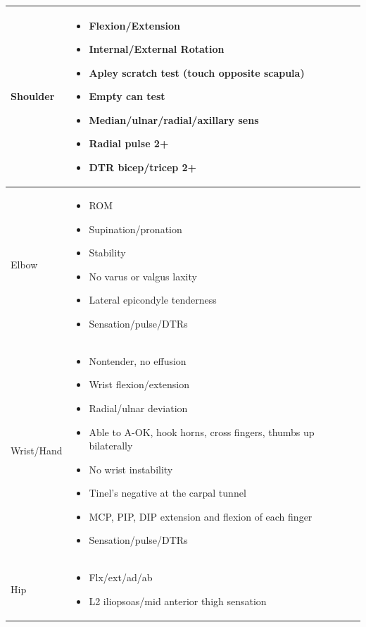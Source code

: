 \documentclass[8pt]{extarticle}
\begin{document}
\begin{tabularx}{\linewidth}{|X|X|}
\hline
Shoulder & 
    \begin{itemize}[leftmargin=*]
        \item[] Flexion/Extension
        \item[] Internal/External Rotation
        \item[] Apley scratch test (touch opposite scapula)
        \item[] Empty can test
        \item[] Median/ulnar/radial/axillary sens
        \item[] Radial pulse 2+
        \item[] DTR bicep/tricep 2+
    \end{itemize}\\
\hline
Elbow & 
    \begin{itemize}[leftmargin=*]
        \item[] ROM
        \item[] Supination/pronation
        \item[] Stability
        \item[] No varus or valgus laxity
        \item[] Lateral epicondyle tenderness
        \item[] Sensation/pulse/DTRs
    \end{itemize}\\
\hline
Wrist/Hand & 
    \begin{itemize}[leftmargin=*]
        \item[] Nontender, no effusion
        \item[] Wrist flexion/extension
        \item[] Radial/ulnar deviation
        \item[] Able to A-OK, hook horns, cross fingers, thumbs up bilaterally
        \item[] No wrist instability
        \item[] Tinel's negative at the carpal tunnel
        \item[] MCP, PIP, DIP extension and flexion of each finger
        \item[] Sensation/pulse/DTRs
    \end{itemize}\\
\hline
Hip & 
    \begin{itemize}[leftmargin=*]
        \item[] Flx/ext/ad/ab
        \item[] L2 iliopsoas/mid anterior thigh sensation

\end{itemize}
\end{tabularx}
\end{document}
